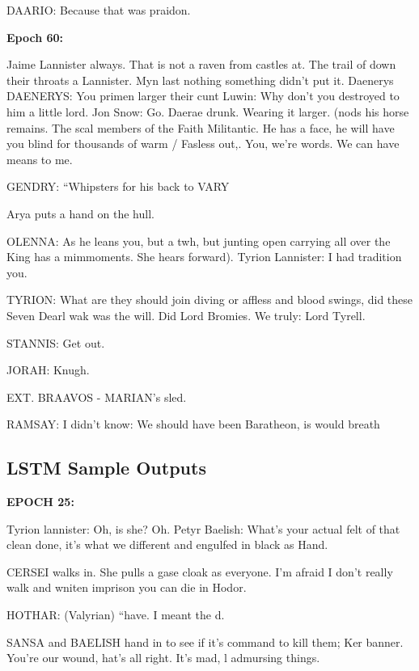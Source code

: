 \documentclass[11pt,a4paper]{article}
\begin{document}
DAARIO: Because that was praidon.\newline 

\textbf{Epoch 60:}\newline 

Jaime Lannister always. That is not a raven from castles at. The trail of down their throats a Lannister. Myn last nothing something didn't put it.
Daenerys DAENERYS: You primen larger their cunt Luwin: Why don't you destroyed to him a little lord.
Jon Snow: Go.
Daerae drunk. Wearing it larger. (nods his horse remains. The scal members of the Faith Militantic.
He has a face, he will have you blind for thousands of warm / Fasless out,. You, we’re words. We can have means to me.

GENDRY: “Whipsters for his back to VARY

Arya puts a hand on the hull.

OLENNA: As he leans you, but a twh, but junting open carrying all over the King has a mimmoments. She hears forward). Tyrion Lannister: I had tradition you.

TYRION: What are they should join diving or affless and blood swings, did these Seven Dearl wak was the will. Did Lord Bromies. We truly: Lord Tyrell.

STANNIS: Get out.

JORAH: Knugh.

EXT. BRAAVOS - MARIAN’s sled.

RAMSAY: I didn’t know: We should have been Baratheon, is would breath\newline 

\subsection{LSTM Sample Outputs}

\textbf{EPOCH 25:}\newline 

Tyrion lannister: Oh, is she? Oh.
Petyr Baelish: What's your actual felt of that clean done, it's what we different and engulfed in black as Hand.

CERSEI walks in. She pulls a gase cloak as everyone. I’m afraid I don't really walk and wniten imprison you can die in Hodor.

HOTHAR: (Valyrian) “have. I meant the d.

SANSA and BAELISH hand in to see if it’s command to kill them; Ker banner. You're our wound, hat's all right. It's mad, l admursing things.
\end{document}
